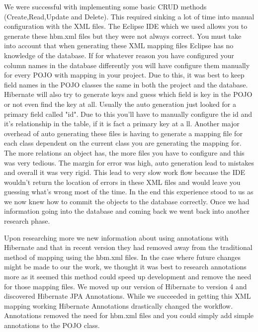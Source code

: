 We were successful with implementing some basic CRUD methods (Create,Read,Update and Delete). This required sinking a lot of time into manual configuration with the XML files. The Eclipse IDE which we used allows you to generate these hbm.xml files but they were not always correct. You must take into account that when generating these XML mapping files Eclipse has no knowledge of the database. If for whatever reason you have configured your column names in the database differently you will have configure them manually for every POJO with mapping in your project. Due to this, it was best to keep field names in the POJO classes the same in both the project and the database. Hibernate will also try to generate keys and guess which field is key in the POJO or not even find the key at all. Usually the auto generation just looked for a primary field called "id". Due to this you'll have to manually configure the id and it's relationship in the table, if it is fact a primary key at a ll. Another major overhead of auto generating these files is having to generate a mapping file for each class dependent on the current class you are generating the mapping for. The more relations an object has, the more files you have to configure and this was very tedious. The margin for error was high, auto generation lead to mistakes and overall it was very rigid. This lead to very slow work flow because the IDE wouldn't return the location of errors in these XML files and would leave you guessing what's wrong most of the time. In  the end this experience stood to us as we now knew how to commit the objects to the database correctly. Once we had information going into the database and coming back we went back into another research phase.

Upon researching more we new information about using annotations with Hibernate and that in recent version they had removed away from the traditional method of mapping using the hbm.xml files. In the case where future changes might be made to our the work, we thought it was best to research annotations more as it seemed this method could speed up development and remove the need for those mapping files. We moved up our version of Hibernate to version 4 and discovered Hibernate JPA Annotations. While we succeeded in getting this XML mapping working Hibernate Annotations drastically changed the workflow. Annotations removed the need for hbm.xml files and you could simply add simple annotations to the POJO class.


